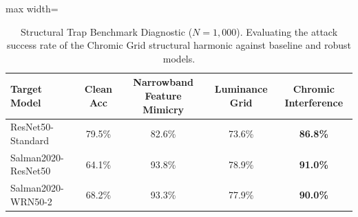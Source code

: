 \begin{table}[htbp]
\centering
\small
\caption{Structural Trap Benchmark Diagnostic ($N=1{,}000$). Evaluating the attack success rate of the Chromic Grid structural harmonic against baseline and robust models.}
\label{tab:full_benchmark}
\begin{adjustbox}{max width=\linewidth}
\begin{tabular}{@{}lcccc@{}}
\toprule
\textbf{Target Model} & \textbf{Clean Acc} & \textbf{Narrowband Feature Mimicry} & \textbf{Luminance Grid} & \textbf{Chromic Interference} \\ \midrule
ResNet50-Standard & 79.5\% & 82.6\% & 73.6\% & \textbf{86.8\%} \\
Salman2020-ResNet50 & 64.1\% & 93.8\% & 78.9\% & \textbf{91.0\%} \\
Salman2020-WRN50-2 & 68.2\% & 93.3\% & 77.9\% & \textbf{90.0\%} \\
\bottomrule
\end{tabular}
\end{adjustbox}
\end{table}
